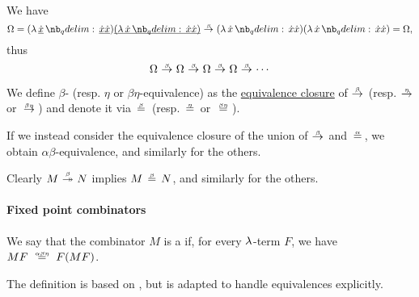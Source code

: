 \begin{example}
\begin{thmenum}
    We have
    \begin{equation*}
      \Omega
      =
      (\qabs {\hi{\synx}} \hi{\synx} \hi{\synx}) \hi{(\qabs \synx \synx \synx)}
      \bred
      (\qabs \synx \synx \synx) (\qabs \synx \synx \synx)
      =
      \Omega,
    \end{equation*}
    thus
    \begin{equation*}
      \Omega \bred \Omega \bred \Omega \bred \Omega \bred \cdots
    \end{equation*}
  \end{thmenum}
\end{example}

\begin{definition}\label{def:beta_eta_equivalence}
  We define \( \beta \)- (resp. \( \eta \) or \( \beta\eta \)-equivalence) as the \hyperref[thm:equivalence_closure]{equivalence closure} of \( {\bred} \) (resp. \( {\ered} \) or \( {\bered} \)) and denote it via \( {\bequiv} \) (resp. \( {\eequiv} \) or \( {\beequiv} \)).

  If we instead consider the equivalence closure of the union of \( {\bred} \) and \( {\aequiv} \), we obtain \( \alpha\beta \)-equivalence, and similarly for the others.
\end{definition}
\begin{comments}
  \item Clearly \( M \bred* N \) implies \( M \bequiv N \), and similarly for the others.
\end{comments}

\paragraph{Fixed point combinators}

\begin{definition}\label{def:fixed_point_combinator}\mimprovised
  We say that the combinator \( M \) is a  if, for every \( \mathrm{\lambda} \)-term \( F \), we have \( MF \abeequiv F(MF) \).
\end{definition}
\begin{comments}
  \item The definition is based on \cite[6.1.2]{Barendregt1984}, but is adapted to handle equivalences explicitly.
\end{comments}

